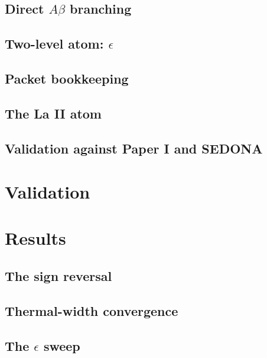 \documentclass[fleqn,usenatbib]{mnras}
\begin{document}
\subsection{Direct $A\beta$ branching}    %
\subsection{Two-level atom: $\epsilon$}   %
\subsection{Packet bookkeeping}           %
\subsection{The La II atom}               %
\subsection{Validation against Paper I and SEDONA}   %

\section{Validation}

\section{Results}
\subsection{The sign reversal}                    %
\subsection{Thermal-width convergence}            %
\subsection{The $\epsilon$ sweep}                 %
\end{document}
